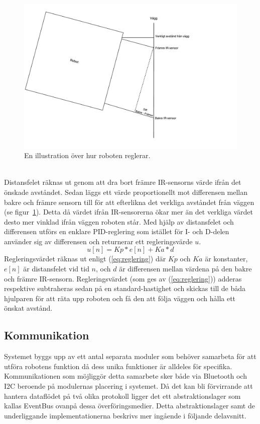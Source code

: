 \documentclass{article}
\begin{document}
\begin{figure}[H]
\centering
\includegraphics[scale=0.4]{Reglering}
\caption{En illustration över hur roboten reglerar.}
\label{fig:reglering}
\end{figure}
\ \\
\newline
Distansfelet räknas ut genom att dra bort främre IR-sensorns värde ifrån det önskade avståndet. Sedan läggs ett värde proportionellt mot differensen mellan bakre och främre sensorn till för att efterlikna det verkliga avståndet från väggen (se figur~\ref{fig:reglering}). Detta då värdet ifrån IR-sensorerna ökar mer än det verkliga värdet desto mer vinklad ifrån väggen roboten står.\newline\newline
Med hjälp av distansfelet och differensen utförs en enklare PID-reglering som istället för I- och D-delen använder sig av differensen och returnerar ett regleringsvärde $u$.
\begin{equation}
u[n] = Kp * e[n] + Ka * d
\label{eq:reglering}
\end{equation}  
Regleringsvärdet räknas ut enligt (\ref{eq:reglering}) där $Kp$ och $Ka$ är konstanter, $e[n]$ är distansfelet vid tid $n$, och $d$ är differensen mellan värdena på den bakre och främre IR-sensorn. Regleringsvärdet (som ges av (\ref{eq:reglering})) adderas respektive subtraheras sedan på en standard-hastighet och skickas till de båda hjulparen för att räta upp roboten och få den att följa väggen och hålla ett önskat avstånd. 

\subsection{Kommunikation}
Systemet byggs upp av ett antal separata moduler som behöver samarbeta för att utföra robotens funktion då dess unika funktioner är alldeles för specifika. Kommunikationen som möjliggör detta samarbete sker både via Bluetooth och I2C beroende på modulernas placering i systemet. Då det kan bli förvirrande att hantera dataflödet på två olika protokoll ligger det ett abstraktionslager som kallas EventBus ovanpå dessa överföringsmedier. Detta abstraktionslager samt de underliggande implementationerna beskrivs mer ingående i följande delavsnitt. 
\end{document}
